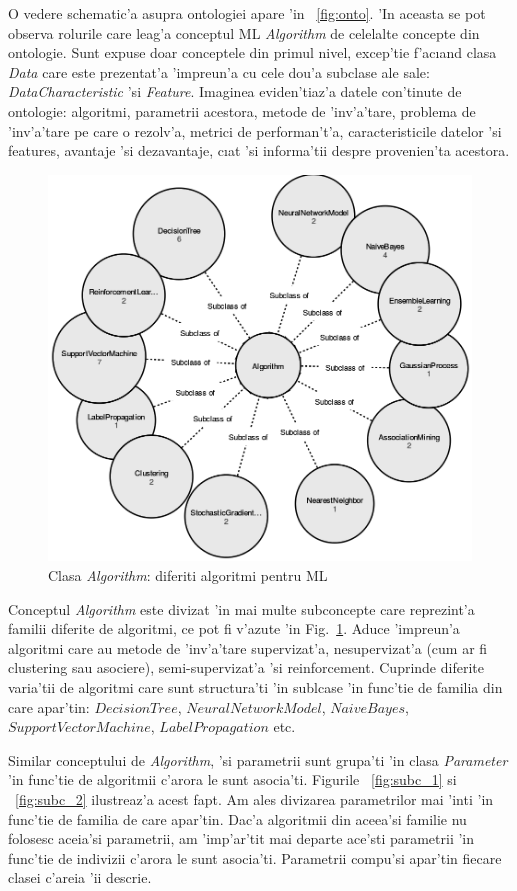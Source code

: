 \documentclass[12pt,a4paper,twoside]{report}
\begin{document}
O vedere schematic'a asupra ontologiei apare 'in ~\ref{fig:onto}. 'In aceasta se pot observa rolurile care leag'a conceptul ML {\it Algorithm} de celelalte concepte din ontologie. Sunt expuse doar conceptele din primul nivel, excep'tie f'ac\i and clasa {\it Data} care este prezentat'a 'impreun'a cu cele dou'a subclase ale sale: {\it DataCharacteristic} 'si {\it Feature}. Imaginea eviden'tiaz'a datele con'tinute de ontologie: algoritmi, parametrii acestora, metode de 'inv'a'tare, problema de 'inv'a'tare pe care o rezolv'a, metrici de performan't'a, caracteristicile datelor 'si features, avantaje 'si dezavantaje, c\i at 'si informa'tii despre provenien'ta acestora.

\begin{figure}[h!]
    \centering
    \includegraphics[width = 0.8 \linewidth]{img/algorithm_subclasses.png}
        \caption{Clasa {\it Algorithm}: diferiti algoritmi pentru ML}
    \label{fig:alg_sucls}
\end{figure}

Conceptul {\it Algorithm} este divizat 'in mai multe subconcepte care reprezint'a familii diferite de algoritmi, ce pot fi v'azute 'in Fig.~\ref{fig:alg_sucls}. Aduce 'impreun'a algoritmi care au metode de 'inv'a'tare supervizat'a, nesupervizat'a (cum ar fi clustering sau asociere), semi-supervizat'a 'si reinforcement. Cuprinde diferite varia'tii de algoritmi care sunt structura'ti 'in sublcase 'in func'tie de familia din care apar'tin: $DecisionTree$, $NeuralNetworkModel$, $NaiveBayes$, $SupportVectorMachine$, $LabelPropagation$ etc.

Similar conceptului de {\it Algorithm}, 'si parametrii sunt grupa'ti 'in clasa {\it Parameter} 'in func'tie de algoritmii c'arora le sunt asocia'ti. Figurile ~\ref{fig:subc_1} si ~\ref{fig:subc_2} ilustreaz'a acest fapt. Am ales divizarea parametrilor mai 'int\ia i 'in func'tie de familia de care apar'tin. Dac'a algoritmii din aceea'si familie nu folosesc aceia'si parametrii, am 'imp'ar'tit mai departe ace'sti parametrii 'in func'tie de indivizii c'arora le sunt asocia'ti. Parametrii compu'si apar'tin fiecare clasei c'areia 'ii descrie. 
\end{document}
